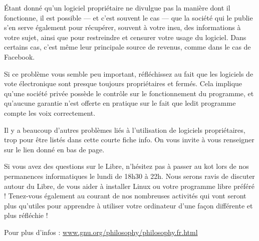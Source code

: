 \documentclass[12pt]{../fiche}
\begin{document}
\vspace{0.8em}

Étant donné qu'un logiciel propriétaire ne divulgue pas la manière dont il fonctionne, il est possible --- et c'est souvent le cas --- que la société qui le publie s'en serve également pour récupérer, souvent à votre insu, des informations à votre sujet, ainsi que pour restreindre et censurer votre usage du logiciel. Dans certains cas, c'est même leur principale source de revenus, comme dans le cas de Facebook.

Si ce problème vous semble peu important, réfléchissez au fait que les logiciels de vote électronique sont presque toujours propriétaires et fermés. Cela implique qu'une société privée possède le contrôle sur le fonctionnement du programme, et qu'aucune garantie n'est offerte en pratique sur le fait que ledit programme compte les voix correctement.

Il y a beaucoup d'autres problèmes liés à l'utilisation de logiciels propriétaires, trop pour être listés dans cette courte fiche info. On vous invite à vous renseigner sur le lien donné en bas de page.

\vspace{0.8em}

Si vous avez des questions sur le Libre, n'hésitez pas à passer au kot lors de nos permanences informatiques le lundi de 18h30 à 22h. Nous serons ravis de discuter autour du Libre, de vous aider à installer Linux ou votre programme libre préféré ! Tenez-vous également au courant de nos nombreuses activités qui vont seront plus qu'utiles pour apprendre à utiliser votre ordinateur d'une façon différente et plus réfléchie !
\vspace{0.8em}

Pour plus d'infos : \url{www.gnu.org/philosophy/philosophy.fr.html}
\end{document}
